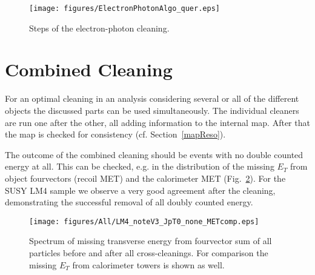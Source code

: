 \documentclass{cmspaper}
\begin{document}
\begin{figure}[hbt]
\begin{center}
\texttt{[image: figures/ElectronPhotonAlgo\_quer.eps]}
\caption{Steps of the electron-photon cleaning.}
\label{fig:EPCleaning}
\end{center}
\end{figure}



\section{Combined Cleaning}
For an optimal cleaning in an analysis considering several or all of the
different objects the discussed parts can be used simultaneously. The individual
cleaners are run one after the other, all adding information to the internal
map. After that the map is checked for consistency (cf. Section~\ref{mapReso}).

The outcome of the combined cleaning should be events with no double counted
energy at all. This can be checked, e.g. in the distribution of the
missing $E_T$ from object fourvectors (recoil MET) and the calorimeter MET
(Fig.~\ref{fig:allMET}). For the SUSY LM4 sample we observe a very good
agreement after the cleaning, demonstrating the successful removal of all doubly
counted energy.

\begin{figure}[hb]
\begin{center}
    \texttt{[image: figures/All/LM4\_noteV3\_JpT0\_none\_METcomp.eps]}
    \caption{Spectrum of missing transverse energy from fourvector sum of all
    particles before and after all cross-cleanings. For comparison
    the missing $E_T$ from calorimeter towers is shown as well.}
\label{fig:allMET}
\end{center}
\end{figure}
\end{document}

